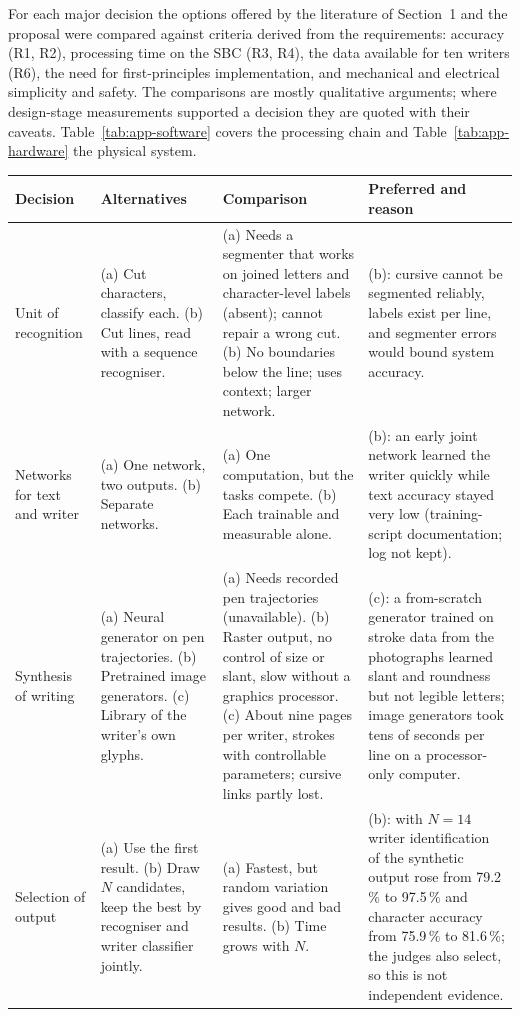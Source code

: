 For each major decision the options offered by the literature of Section~1 and the proposal were compared against criteria derived from the requirements: accuracy (R1, R2), processing time on the SBC (R3, R4), the data available for ten writers (R6), the need for first-principles implementation, and mechanical and electrical simplicity and safety. The comparisons are mostly qualitative arguments; where design-stage measurements supported a decision they are quoted with their caveats. Table~\ref{tab:app-software} covers the processing chain and Table~\ref{tab:app-hardware} the physical system.

\begin{table}[htbp]
\centering
\fontsize{9}{10.5}\selectfont
\begin{tabular}{|p{1.6cm}|p{3.4cm}|p{4.3cm}|p{4.3cm}|}
\hline
\textbf{Decision} & \textbf{Alternatives} & \textbf{Comparison} & \textbf{Preferred and reason} \\
\hline
Unit of recognition & (a) Cut characters, classify each. (b) Cut lines, read with a sequence recogniser. & (a) Needs a segmenter that works on joined letters and character-level labels (absent); cannot repair a wrong cut. (b) No boundaries below the line; uses context; larger network. & (b): cursive cannot be segmented reliably, labels exist per line, and segmenter errors would bound system accuracy. \\
\hline
Networks for text and writer & (a) One network, two outputs. (b) Separate networks. & (a) One computation, but the tasks compete. (b) Each trainable and measurable alone. & (b): an early joint network learned the writer quickly while text accuracy stayed very low (training-script documentation; log not kept). \\
\hline
Synthesis of writing & (a) Neural generator on pen trajectories. (b) Pretrained image generators. (c) Library of the writer's own glyphs. & (a) Needs recorded pen trajectories (unavailable). (b) Raster output, no control of size or slant, slow without a graphics processor. (c) About nine pages per writer, strokes with controllable parameters; cursive links partly lost. & (c): a from-scratch generator trained on stroke data from the photographs learned slant and roundness but not legible letters; image generators took tens of seconds per line on a processor-only computer. \\
\hline
Selection of output & (a) Use the first result. (b) Draw $N$ candidates, keep the best by recogniser and writer classifier jointly. & (a) Fastest, but random variation gives good and bad results. (b) Time grows with $N$. & (b): with $N=14$ writer identification of the synthetic output rose from 79.2\,\% to 97.5\,\% and character accuracy from 75.9\,\% to 81.6\,\%; the judges also select, so this is not independent evidence. \\

\end{tabular}
\end{table}
